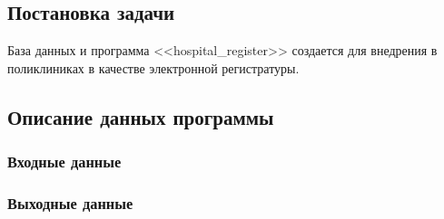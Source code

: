 \subsection{Постановка задачи}

База данных и программа <<hospital\_register>> создается для внедрения в поликлиниках в качестве электронной регистратуры.

\subsection{Описание данных программы}
\subsubsection{Входные данные}


\subsubsection{Выходные данные}











